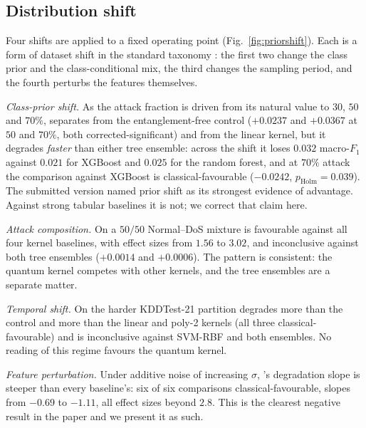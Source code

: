 \subsection{Distribution shift}
\label{sec:res-c3}

\begin{revbody}


Four shifts are applied to a fixed operating point (Fig.~\ref{fig:priorshift}).
Each is a form of dataset shift in the standard taxonomy \cite{ref33}: the first
two change the class prior and the class-conditional mix, the third changes the
sampling period, and the fourth perturbs the features themselves.

\emph{Class-prior shift.} As the attack fraction is driven from its natural
value to $30$, $50$ and $70\%$, \QSVM{} separates from the entanglement-free
control ($+0.0237$ and $+0.0367$ at $50$ and $70\%$, both corrected-significant)
and from the linear kernel, but it degrades \emph{faster} than either tree
ensemble: across the shift it loses $0.032$ macro-$F_1$ against $0.021$ for
XGBoost and $0.025$ for the random forest, and at $70\%$ attack the comparison
against XGBoost is classical-favourable ($-0.0242$, $p_{\text{Holm}}=0.039$).
The submitted version named prior shift as its strongest evidence of advantage.
Against strong tabular baselines it is not; we correct that claim here.

\emph{Attack composition.} On a $50/50$ Normal--DoS mixture \QSVM{} is
favourable against all four kernel baselines, with effect sizes from $1.56$ to
$3.02$, and inconclusive against both tree ensembles ($+0.0014$ and $+0.0006$).
The pattern is consistent: the quantum kernel competes with other kernels, and
the tree ensembles are a separate matter.

\emph{Temporal shift.} On the harder KDDTest-21 partition \QSVM{} degrades more
than the control and more than the linear and poly-2 kernels (all three
classical-favourable) and is inconclusive against SVM-RBF and both ensembles.
No reading of this regime favours the quantum kernel.

\emph{Feature perturbation.} Under additive noise of increasing $\sigma$,
\QSVM{}'s degradation slope is steeper than every baseline's: six of six
comparisons classical-favourable, slopes from $-0.69$ to $-1.11$, all effect
sizes beyond $2.8$. This is the clearest negative result in the paper and we
present it as such.
\end{revbody}

